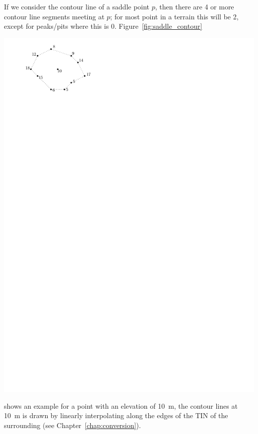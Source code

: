 If we consider the contour line of a saddle point $p$, then there are 4 or more contour line segments meeting at $p$; for most point in a terrain this will be 2, except for peaks/pits where this is 0.
Figure~\ref{fig:saddle_contour}
\begin{marginfigure}
  \centering
  \includegraphics[page=2,width=\textwidth]{figs/saddle_contour}
  \caption{A saddle point at elevation \SI{10}{\m}, and its surrounding points. The triangulation of the area is created and used to extract the contour line segments at \SI{10}{\m} (red lines).}%
\label{fig:saddle_contour}
\end{marginfigure}
shows an example for a point with an elevation of \SI{10}{\m}, the contour lines at \SI{10}{\m} is drawn by linearly interpolating along the edges of the TIN of the surrounding (see Chapter~\ref{chap:conversion}).


